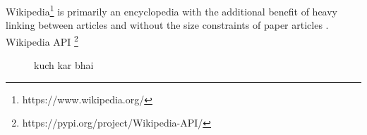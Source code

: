 Wikipedia\footnote{https://www.wikipedia.org/} is primarily an encyclopedia with the additional benefit of heavy linking between articles and without the size constraints of paper articles \cite{TorstenZesch}. Wikipedia API \footnote{https://pypi.org/project/Wikipedia-API/}




\begin{figure}[h!]
    \centering
    
    \caption{kuch kar bhai}
    \label{fig:propn}
\end{figure}


